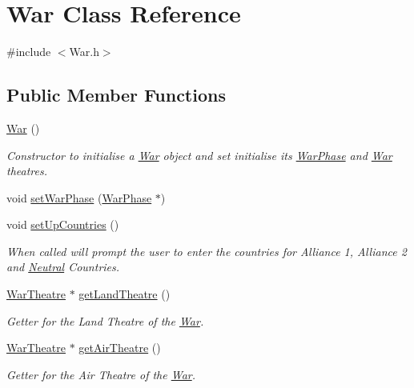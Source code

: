 \hypertarget{class_war}{}\section{War Class Reference}
\label{class_war}


{\ttfamily \#include $<$War.\+h$>$}

\subsection*{Public Member Functions}
\begin{DoxyCompactItemize}
\item 
\mbox{\hyperlink{class_war_a8e837395251af1ea071b3624e85c5a67}{War}} ()
\begin{DoxyCompactList}\small\item\em Constructor to initialise a \mbox{\hyperlink{class_war}{War}} object and set initialise its \mbox{\hyperlink{class_war_phase}{War\+Phase}} and \mbox{\hyperlink{class_war}{War}} theatres. \end{DoxyCompactList}\item 
void \mbox{\hyperlink{class_war_adc066403ed93bf9d63585297d75f100f}{set\+War\+Phase}} (\mbox{\hyperlink{class_war_phase}{War\+Phase}} $\ast$)
\item 
void \mbox{\hyperlink{class_war_a116e1664062340f607ea9d19e4c79670}{set\+Up\+Countries}} ()
\begin{DoxyCompactList}\small\item\em When called will prompt the user to enter the countries for Alliance 1, Alliance 2 and \mbox{\hyperlink{class_neutral}{Neutral}} Countries. \end{DoxyCompactList}\item 
\mbox{\hyperlink{class_war_theatre}{War\+Theatre}} $\ast$ \mbox{\hyperlink{class_war_aea332c2abc668d6d70744cdb52546bae}{get\+Land\+Theatre}} ()
\begin{DoxyCompactList}\small\item\em Getter for the Land Theatre of the \mbox{\hyperlink{class_war}{War}}. \end{DoxyCompactList}\item 
\mbox{\hyperlink{class_war_theatre}{War\+Theatre}} $\ast$ \mbox{\hyperlink{class_war_a676ab0df108bc16b7de2616b2d7b90f8}{get\+Air\+Theatre}} ()
\begin{DoxyCompactList}\small\item\em Getter for the Air Theatre of the \mbox{\hyperlink{class_war}{War}}. \end{DoxyCompactList}\item 

\end{DoxyCompactItemize}
